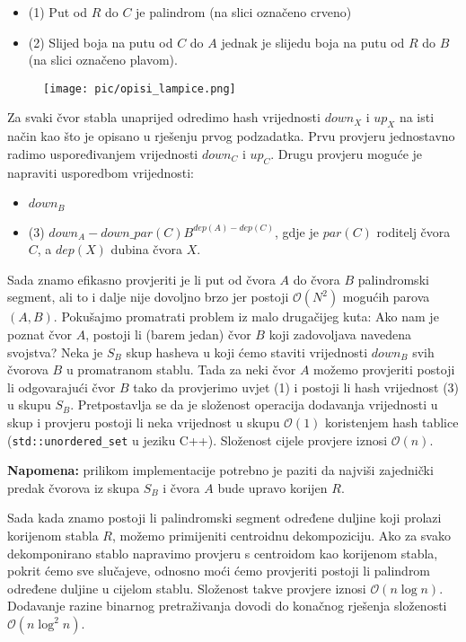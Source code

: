 \documentclass[a4paper]{article}
\begin{document}
\begin{itemize}
  \item (1) Put od $R$ do $C$ je palindrom (na slici označeno crveno)
  \item (2) Slijed boja na putu od $C$ do $A$ jednak je slijedu boja na putu od $R$
    do $B$ (na slici označeno plavom).
\end{itemize}

\begin{figure}[!htbp]
\centering
\texttt{[image: pic/opisi\_lampice.png]}
\end{figure}

Za svaki čvor stabla unaprijed odredimo hash vrijednosti $down_X$ i $up_X$ na
isti način kao što je opisano u rješenju prvog podzadatka. Prvu provjeru
jednostavno radimo uspoređivanjem vrijednosti $down_C$ i $up_C$. Drugu provjeru
moguće je napraviti usporedbom vrijednosti:

\begin{itemize}
  \item $down_B$
  \item (3) $down_A - down\_par(C) B^{dep(A)-dep(C)}$, gdje je $par(C)$ roditelj
        čvora $C$, a $dep(X)$ dubina čvora $X$.
\end{itemize}

Sada znamo efikasno provjeriti je li put od čvora $A$ do čvora $B$ palindromski
segment, ali to i dalje nije dovoljno brzo jer postoji $\mathcal{O}(N^2)$
mogućih parova $(A, B)$. Pokušajmo promatrati problem iz malo drugačijeg kuta:
Ako nam je poznat čvor $A$, postoji li (barem jedan) čvor $B$ koji zadovoljava
navedena svojstva?  Neka je $S_B$ skup hasheva u koji ćemo staviti vrijednosti
$down_B$ svih čvorova $B$ u promatranom stablu. Tada za neki čvor $A$ možemo
provjeriti postoji li odgovarajući čvor $B$ tako da provjerimo uvjet (1) i
postoji li hash vrijednost (3) u skupu $S_B$. Pretpostavlja se da je složenost
operacija dodavanja vrijednosti u skup i provjeru postoji li neka vrijednost u
skupu $\mathcal{O}(1)$ koristenjem hash tablice (\texttt{std::unordered\_set} u
jeziku C++). Složenost cijele provjere iznosi $\mathcal{O}(n)$.

\textbf{Napomena:} prilikom implementacije potrebno je paziti da najviši
zajednički predak čvorova iz skupa $S_B$ i čvora $A$ bude upravo korijen $R$.

Sada kada znamo postoji li palindromski segment određene duljine koji prolazi
korijenom stabla $R$, možemo primijeniti centroidnu dekompoziciju. Ako za svako
dekomponirano stablo napravimo provjeru s centroidom kao korijenom stabla,
pokrit ćemo sve slučajeve, odnosno moći ćemo provjeriti postoji li palindrom
određene duljine u cijelom stablu. Složenost takve provjere iznosi $\mathcal{O}(n \log n)$.
Dodavanje razine binarnog pretraživanja dovodi do konačnog rješenja složenosti
$\mathcal{O}(n \log^2 n)$.
\end{document}
